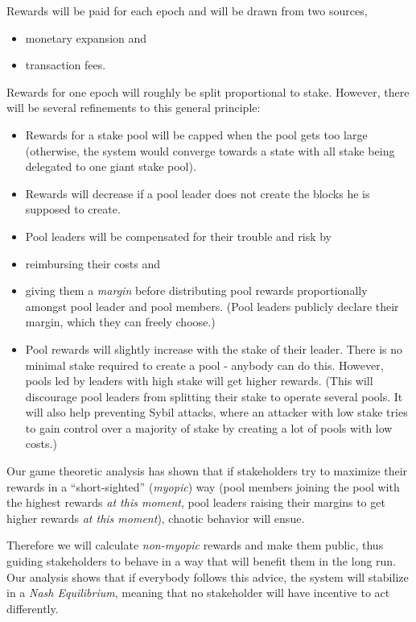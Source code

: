 \documentclass[11pt,a4paper]{article}
\begin{document}
Rewards will be paid for each epoch and will be drawn from two sources,

\begin{itemize}
\item
  monetary expansion and
\item
  transaction fees.
\end{itemize}

Rewards for one epoch will roughly be split proportional to stake.
However, there will be several refinements to this general principle:

\begin{itemize}
\item
  Rewards for a stake pool will be capped when the pool gets too large
  (otherwise, the system would converge towards a state with all stake
  being delegated to one giant stake pool).
\item
  Rewards will decrease if a pool leader does not create the blocks he
  is supposed to create.
\item
  Pool leaders will be compensated for their trouble and risk by
\item
  reimbursing their costs and
\item
  giving them a \emph{margin} before distributing pool rewards
  proportionally amongst pool leader and pool members. (Pool leaders
  publicly declare their margin, which they can freely choose.)
\item
  Pool rewards will slightly increase with the stake of their leader.
  There is no minimal stake required to create a pool - anybody can do
  this. However, pools led by leaders with high stake will get higher
  rewards. (This will discourage pool leaders from splitting their stake
  to operate several pools. It will also help preventing Sybil attacks,
  where an attacker with low stake tries to gain control over a majority
  of stake by creating a lot of pools with low costs.)
\end{itemize}

Our game theoretic analysis has shown that if stakeholders try to
maximize their rewards in a ``short-sighted'' (\emph{myopic}) way (pool
members joining the pool with the highest rewards \emph{at this moment},
pool leaders raising their margins to get higher rewards \emph{at this
moment}), chaotic behavior will ensue.

Therefore we will calculate \emph{non-myopic} rewards and make them
public, thus guiding stakeholders to behave in a way that will benefit
them in the long run. Our analysis shows that if everybody follows this
advice, the system will stabilize in a \emph{Nash Equilibrium}, meaning
that no stakeholder will have incentive to act differently.
\end{document}
